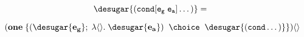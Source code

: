 \documentclass[]{article}
\begin{document}
$$
\desugar{\tt{(cond [} e_g \; e_a \tt{] \dots)}} =  \;\; 
$$

$$
(\bf{one} \; \{(\desugar{e_{g}} ; \; \lambda\langle\rangle.\; \desugar{e_{a}}) \;\; \choice \;\;
\desugar{\tt{(cond \dots)}}\})\langle\rangle  \\
$$  




















\end{document}
